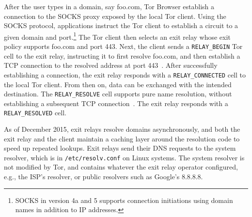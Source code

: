After the user types in a domain, say foo.com, Tor Browser establish a
connection to the SOCKS proxy exposed by the local Tor client.  Using the SOCKS
protocol, applications instruct the Tor client to establish a circuit to a given
domain and port.\footnote{SOCKS in version 4a and 5 supports connection
initiations using domain names in addition to IP addresses.} The Tor client then
selects an exit relay whose exit policy supports foo.com and port 443.  Next,
the client sends a \texttt{RELAY\_BEGIN} Tor cell to the exit relay, instructing
it to first resolve foo.com, and then establish a TCP connection to the resolved
address at port 443~\cite[\S~6.2]{tor-spec}.  After successfully establishing a
connection, the exit relay responds with a \texttt{RELAY\_CONNECTED} cell to the
local Tor client.  From then on, data can be exchanged with the intended
destination.  The \texttt{RELAY\_RESOLVE} cell supports pure name resolution,
without establishing a subsequent TCP connection~\cite[\S~6.4]{tor-spec}.  The
exit relay responds with a \texttt{RELAY\_RESOLVED} cell.

As of December 2015, exit relays resolve domains asynchronously, and both the
exit relay and the client maintain a caching layer around the resolution code to
speed up repeated lookups.  Exit relays send their DNS requests to the system
resolver, which is in \texttt{/etc/resolv.conf} on Linux systems.  The system
resolver is not modified by Tor, and contains whatever the exit relay operator
configured, e.g., the ISP's resolver, or public resolvers such as Google's
8.8.8.8.
